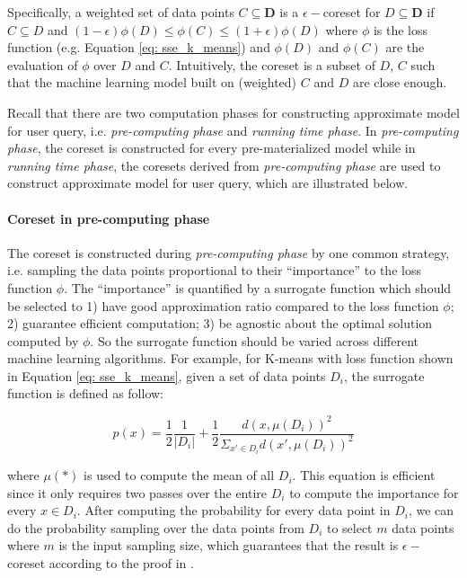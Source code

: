 Specifically, a weighted set of data points $C \subseteq \textbf{D}$ is a $\epsilon-$coreset for $D \subseteq \textbf{D}$ if $C \subseteq D$ and $(1-\epsilon)\phi(D) \leq \phi(C) \leq (1+\epsilon)\phi(D)$ where $\phi$ is the loss function (e.g. Equation \ref{eq: sse_k_means}) and $\phi(D)$ and $\phi(C)$ are the evaluation of $\phi$ over $D$ and $C$. Intuitively, the coreset is a subset of $D$, $C$ such that the machine learning model built on (weighted) $C$ and $D$ are close enough.

Recall that there are two computation phases for constructing approximate model for user query, i.e. {\em pre-computing phase} and {\em running time phase}. In {\em pre-computing phase}, the coreset is constructed for every pre-materialized model while in {\em running time phase}, the coresets derived from {\em pre-computing phase} are used to construct approximate model for user query, which are illustrated below.

\paragraph{Coreset in pre-computing phase} The coreset is constructed during {\em pre-computing phase} by one common strategy, i.e. sampling the data points proportional to their ``importance'' to the loss function $\phi$. The ``importance'' is quantified by a surrogate function which should be selected to 1) have good approximation ratio compared to the loss function $\phi$; 2) guarantee efficient computation; 3) be  agnostic about the optimal solution computed by $\phi$. So the surrogate function should be varied across different machine learning algorithms. For example, for K-means with loss function shown in Equation \ref{eq: sse_k_means}, given a set of data points $D_i$, the surrogate function is defined as follow:

\begin{equation}\label{eq: surrogate_function}
    p(x) = \frac{1}{2}\frac{1}{|D_i|} + \frac{1}{2}\frac{d(x, \mu(D_i))^2}{\Sigma_{x'\in D_i}d(x', \mu(D_i))^2}
\end{equation}

where $\mu(*)$ is used to compute the mean of all $D_i$. This equation is efficient since it only requires two passes over the entire $D_i$ to compute the importance for every $x \in D_i$. After computing the probability for every data point in $D_i$, we can do the probability sampling over the data points from $D_i$ to select $m$ data points where $m$ is the input sampling size, which guarantees that the result is $\epsilon-$coreset according to the proof in \cite{bachem2017scalable}.

